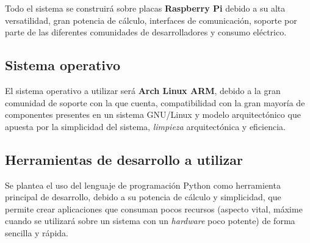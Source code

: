 Todo el sistema se construirá sobre placas \textbf{Raspberry Pi} debido a su alta versatilidad, gran potencia de cálculo, interfaces de comunicación, soporte por parte de las diferentes comunidades de desarrolladores y consumo eléctrico.

\subsection{Sistema operativo}

El sistema operativo a utilizar será \textbf{Arch Linux ARM}, debido a la gran comunidad de soporte con la que cuenta, compatibilidad con la gran mayoría de componentes presentes en un sistema GNU/Linux y modelo arquitectónico que apuesta por la simplicidad del sistema, \textit{limpieza} arquitectónica y eficiencia.

\subsection{Herramientas de desarrollo a utilizar}

Se plantea el uso del lenguaje de programación Python como herramienta principal de desarrollo, debido a su potencia de cálculo y simplicidad, que permite crear aplicaciones que consuman pocos recursos (aspecto vital, máxime cuando se utilizará sobre un sistema con un \textit{hardware} poco potente) de forma sencilla y rápida.